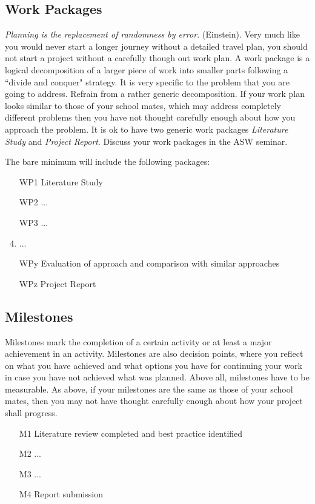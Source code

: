 \documentclass[thesis]{mas_proposal}
\begin{document}
\subsection{Work Packages}
\emph{Planning is the replacement of randomness by error.} (Einstein). Very much like you would never start a longer journey without a detailed travel plan, you should not start a project without a carefully though out work plan. A work package is a logical decomposition of a larger piece of work into smaller parts following a ``divide and conquer" strategy. It is very specific to the problem that you are going to address. Refrain from a rather generic decomposition. If your work plan looks similar to those of your school mates, which may address completely different problems then you have not thought carefully enough about how you approach the problem. It is ok to have two generic work packages \emph{Literature Study} and \emph{Project Report}. Discuss your work packages in the ASW seminar.

The bare minimum will include the following packages:
\begin{enumerate}
    \item[WP1] Literature Study
    \item[WP2] ...
    \item[WP3] ...
    \item  ...
    \item[WPy] Evaluation of approach and comparison with similar approaches
    \item[WPz] Project Report
\end{enumerate}

\subsection{Milestones}
Milestones mark the completion of a certain activity or at least a major achievement in an activity. Milestones are also decision points, where you reflect on what you have achieved and what options you have for continuing your work in case you have not achieved what was planned. Above all, milestones have to be measurable. As above, if your milestones are the same as those of your school mates, then you may not have thought carefully enough about how your project shall progress.
\begin{enumerate}
    \item[M1] Literature review completed and best practice identified
    \item[M2] ...
    \item[M3] ...
    \item[M4] Report submission
\end{enumerate}
\end{document}
